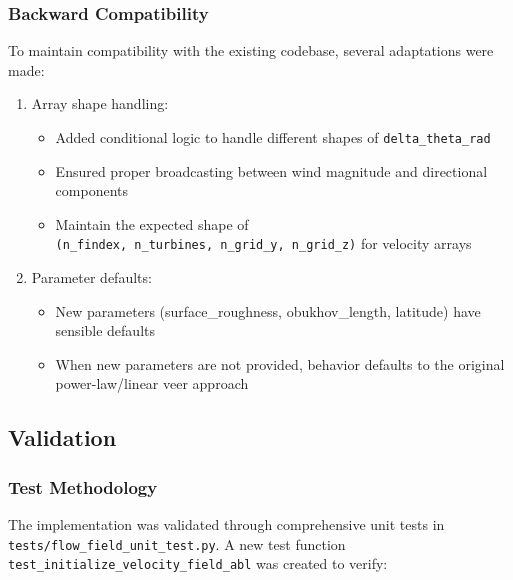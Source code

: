 \documentclass{article}
\begin{document}
\hypertarget{backward-compatibility}{%
\subsubsection{Backward Compatibility}\label{backward-compatibility}}

To maintain compatibility with the existing codebase, several
adaptations were made:

\begin{enumerate}[label=\arabic*.]
\item
  Array shape handling:

  \begin{itemize}[label=\textbullet]
  \item
    Added conditional logic to handle different shapes of
    \texttt{delta\_theta\_rad}
  \item
    Ensured proper broadcasting between wind magnitude and directional
    components
  \item
    Maintain the expected shape of
    \texttt{(n\_findex,\ n\_turbines,\ n\_grid\_y,\ n\_grid\_z)} for
    velocity arrays
  \end{itemize}
\item
  Parameter defaults:

  \begin{itemize}[label=\textbullet]
  \item
    New parameters (surface\_roughness, obukhov\_length, latitude) have
    sensible defaults
  \item
    When new parameters are not provided, behavior defaults to the
    original power-law/linear veer approach
  \end{itemize}
\end{enumerate}

\hypertarget{validation}{%
\subsection{Validation}\label{validation}}

\hypertarget{test-methodology}{%
\subsubsection{Test Methodology}\label{test-methodology}}

The implementation was validated through comprehensive unit tests in
\texttt{tests/flow\_field\_unit\_test.py}. A new test function
\texttt{test\_initialize\_velocity\_field\_abl} was created to verify:
\end{document}
